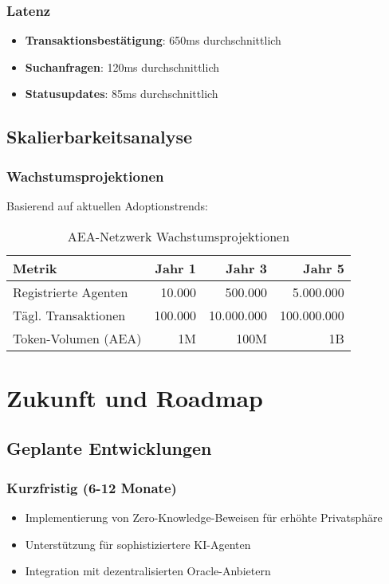 \documentclass[12pt,a4paper]{article}
\begin{document}
\subsubsection{Latenz}

\begin{itemize}
\item \textbf{Transaktionsbestätigung}: 650ms durchschnittlich
\item \textbf{Suchanfragen}: 120ms durchschnittlich
\item \textbf{Statusupdates}: 85ms durchschnittlich
\end{itemize}

\subsection{Skalierbarkeitsanalyse}

\subsubsection{Wachstumsprojektionen}

Basierend auf aktuellen Adoptionstrends:

\begin{table}[H]
\centering
\begin{tabular}{lrrr}
\toprule
\textbf{Metrik} & \textbf{Jahr 1} & \textbf{Jahr 3} & \textbf{Jahr 5} \\
\midrule
Registrierte Agenten & 10.000 & 500.000 & 5.000.000 \\
Tägl. Transaktionen & 100.000 & 10.000.000 & 100.000.000 \\
Token-Volumen (AEA) & 1M & 100M & 1B \\
\bottomrule
\end{tabular}
\caption{AEA-Netzwerk Wachstumsprojektionen}
\end{table}

\section{Zukunft und Roadmap}

\subsection{Geplante Entwicklungen}

\subsubsection{Kurzfristig (6-12 Monate)}
\begin{itemize}
\item Implementierung von Zero-Knowledge-Beweisen für erhöhte Privatsphäre
\item Unterstützung für sophistiziertere KI-Agenten
\item Integration mit dezentralisierten Oracle-Anbietern
\end{itemize}
\end{document}
